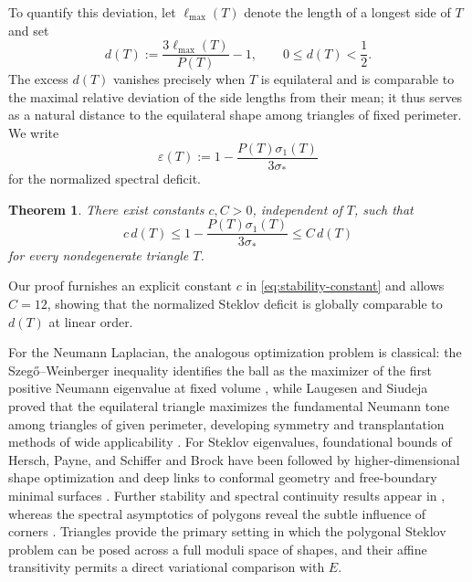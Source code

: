 \documentclass[11pt,reqno]{amsart}
\numberwithin{equation}{section}
\newtheorem{theorem}{Theorem}[section]
\theoremstyle{remark}
\begin{document}
To quantify this deviation, let $\ell_{\max}(T)$ denote the length of a longest side of $T$ and set
\begin{equation}\label{eq:side-defect}
 d(T):=\frac{3\ell_{\max}(T)}{P(T)}-1,
 \qquad 0\le d(T)<\frac12.
\end{equation}
The excess $d(T)$ vanishes precisely when $T$ is equilateral and is comparable to the maximal relative deviation of the side lengths from their mean; it thus serves as a natural distance to the equilateral shape among triangles of fixed perimeter.
We write
\begin{equation}\label{eq:deficit}
 \varepsilon(T):=1-\frac{P(T)\sigma_1(T)}{3\sigma_*}
\end{equation}
for the normalized spectral deficit.
\begin{theorem}\label{thm:stability}
There exist constants $c,C>0$, independent of $T$, such that
\begin{equation}\label{eq:stability}
 c\,d(T)\le
 1-\frac{P(T)\sigma_1(T)}{3\sigma_*}
 \le C\,d(T)
\end{equation}
for every nondegenerate triangle $T$.
\end{theorem}
Our proof furnishes an explicit constant $c$ in
\eqref{eq:stability-constant} and allows $C=12$, showing that the normalized Steklov deficit is globally comparable to $d(T)$ at linear order.

For the Neumann Laplacian, the analogous optimization problem is classical: the Szeg\H{o}--Weinberger inequality identifies the ball as the maximizer of the first positive Neumann eigenvalue at fixed volume \cite{Szego,Weinberger}, while Laugesen and Siudeja \cite{LS2009} proved that the equilateral triangle maximizes the fundamental Neumann tone among triangles of given perimeter, developing symmetry and transplantation methods of wide applicability \cite{LS2011}. For Steklov eigenvalues, foundational bounds of Hersch, Payne, and Schiffer \cite{HPS} and Brock \cite{Brock} have been followed by higher-dimensional shape optimization \cite{FS2019} and deep links to conformal geometry and free-boundary minimal surfaces \cite{FS2011,FS2016}. Further stability and spectral continuity results appear in \cite{BDR,FL}, whereas the spectral asymptotics of polygons reveal the subtle influence of corners \cite{LPPS}. Triangles provide the primary setting in which the polygonal Steklov problem can be posed across a full moduli space of shapes, and their affine transitivity permits a direct variational comparison with $E$.
\end{document}
